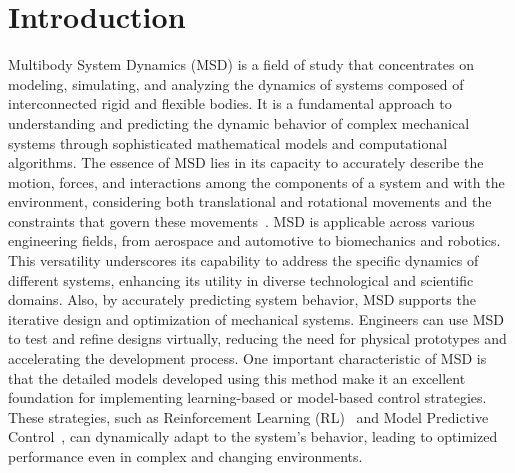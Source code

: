 \section{Introduction}

Multibody System Dynamics (MSD) is a field of study that concentrates on modeling, simulating, and analyzing the dynamics of systems composed of interconnected rigid and flexible bodies. It is a fundamental approach to understanding and predicting the dynamic behavior of complex mechanical systems through sophisticated mathematical models and computational algorithms. The essence of MSD lies in its capacity to accurately describe the motion, forces, and interactions among the components of a system and with the environment, considering both translational and rotational movements and the constraints that govern these movements~\cite{shabana2013dynMSD}. MSD is applicable across various engineering fields, from aerospace and automotive to biomechanics and robotics. This versatility underscores its capability to address the specific dynamics of different systems, enhancing its utility in diverse technological and scientific domains. Also, by accurately predicting system behavior, MSD supports the iterative design and optimization of mechanical systems. Engineers can use MSD to test and refine designs virtually, reducing the need for physical prototypes and accelerating the development process. One important characteristic of MSD is that the detailed models developed using this method make it an excellent foundation for implementing learning-based or model-based control strategies. These strategies, such as Reinforcement Learning (RL)~\cite{sutton_reinforcement_2018} and Model Predictive Control~\cite{schwenzer2021mpc}, can dynamically adapt to the system's behavior, leading to optimized performance even in complex and changing environments.

